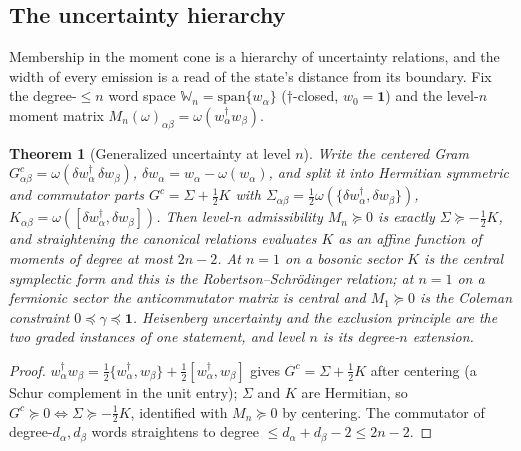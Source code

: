 \documentclass[11pt]{article}
\newtheorem{theorem}{Theorem}[section]
\theoremstyle{definition}
\theoremstyle{remark}
\newcommand{\W}{\mathbb{W}}
\begin{document}
\subsection{The uncertainty hierarchy}\label{sec:uncertainty}
Membership in the moment cone is a hierarchy of uncertainty relations, and
the width of every emission is a read of the state's distance from its
boundary.  Fix the degree-$\le n$ word space $\W_n =
\mathrm{span}\{w_\alpha\}$ ($\dagger$-closed, $w_0 = \mathbf 1$) and the
level-$n$ moment matrix $M_n(\omega)_{\alpha\beta} = \omega(w_\alpha^\dagger
w_\beta)$.

\begin{theorem}[Generalized uncertainty at level $n$]\label{thm:uncertainty}
Write the centered Gram $G^c_{\alpha\beta} = \omega(\delta w_\alpha^\dagger
\,\delta w_\beta)$, $\delta w_\alpha = w_\alpha - \omega(w_\alpha)$, and
split it into Hermitian symmetric and commutator parts $G^c = \Sigma +
\tfrac12 K$ with $\Sigma_{\alpha\beta} = \tfrac12
\omega(\{\delta w_\alpha^\dagger, \delta w_\beta\})$, $K_{\alpha\beta} =
\omega([\delta w_\alpha^\dagger, \delta w_\beta])$.  Then level-$n$
admissibility $M_n \succeq 0$ is exactly $\Sigma \succeq -\tfrac12 K$, and
straightening the canonical relations evaluates $K$ as an affine function
of moments of degree at most $2n-2$.  At $n=1$ on a bosonic sector $K$ is
the central symplectic form and this is the Robertson--Schr\"odinger
relation; at $n=1$ on a fermionic sector the anticommutator matrix is
central and $M_1 \succeq 0$ is the Coleman constraint $0 \preceq \gamma
\preceq \mathbf 1$.  Heisenberg uncertainty and the exclusion principle are
the two graded instances of one statement, and level $n$ is its degree-$n$
extension.
\end{theorem}
\begin{proof}
$w_\alpha^\dagger w_\beta = \tfrac12\{w_\alpha^\dagger, w_\beta\} + \tfrac12
[w_\alpha^\dagger, w_\beta]$ gives $G^c = \Sigma + \tfrac12 K$ after
centering (a Schur complement in the unit entry); $\Sigma$ and $K$ are
Hermitian, so $G^c \succeq 0 \iff \Sigma \succeq -\tfrac12 K$, identified
with $M_n \succeq 0$ by centering.  The commutator of degree-$d_\alpha,
d_\beta$ words straightens to degree $\le d_\alpha + d_\beta - 2 \le 2n-2$.
\end{proof}
\end{document}

